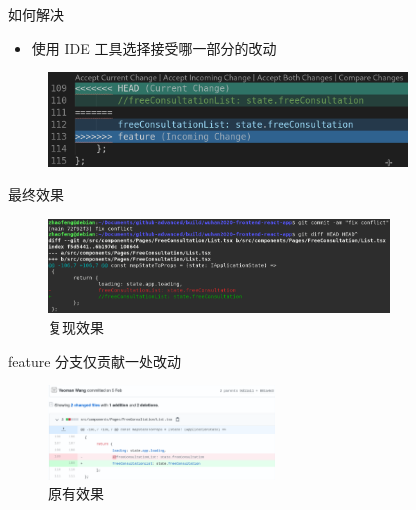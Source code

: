 \documentclass[notheorems,xetex]{beamer}
\begin{document}
\begin{frame}{如何解决}
\begin{itemize}
	\item 使用 IDE 工具选择接受哪一部分的改动
\end{itemize}
\begin{figure}
	\includegraphics[height=2.5cm]{accept_incoming.png}
\end{figure}

\end{frame}
\begin{frame}{最终效果}
\begin{figure}
\includegraphics[height=2.5cm]{recover_changes.png}
\caption{复现效果}
\end{figure}
\begin{center}
feature 分支仅贡献一处改动
\end{center}
\begin{figure}
	\includegraphics[height=2.5cm]{original.png}
	\caption{原有效果}
\end{figure}
\end{frame}




\end{document}
